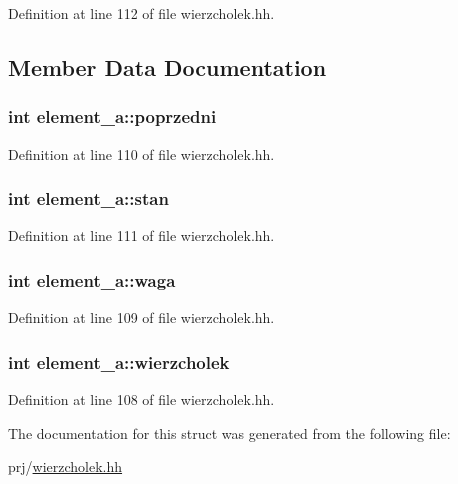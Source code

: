 \-Definition at line 112 of file wierzcholek.\-hh.



\subsection{\-Member \-Data \-Documentation}
\hypertarget{structelement__a_a4e6b23a45c539eea4ab51d74aeef11e2}{
\subsubsection[{poprzedni}]{\setlength{\rightskip}{0pt plus 5cm}int {\bf element\-\_\-a\-::poprzedni}}}\label{structelement__a_a4e6b23a45c539eea4ab51d74aeef11e2}


\-Definition at line 110 of file wierzcholek.\-hh.

\hypertarget{structelement__a_a1be911aa9cf4faf7105ae58ec04d4bd7}{
\subsubsection[{stan}]{\setlength{\rightskip}{0pt plus 5cm}int {\bf element\-\_\-a\-::stan}}}\label{structelement__a_a1be911aa9cf4faf7105ae58ec04d4bd7}


\-Definition at line 111 of file wierzcholek.\-hh.

\hypertarget{structelement__a_a0c44e77b4e694ff0f7e2a5ec75a78f48}{
\subsubsection[{waga}]{\setlength{\rightskip}{0pt plus 5cm}int {\bf element\-\_\-a\-::waga}}}\label{structelement__a_a0c44e77b4e694ff0f7e2a5ec75a78f48}


\-Definition at line 109 of file wierzcholek.\-hh.

\hypertarget{structelement__a_acebbe0c4962a9b7f11702c041474bdfc}{
\subsubsection[{wierzcholek}]{\setlength{\rightskip}{0pt plus 5cm}int {\bf element\-\_\-a\-::wierzcholek}}}\label{structelement__a_acebbe0c4962a9b7f11702c041474bdfc}


\-Definition at line 108 of file wierzcholek.\-hh.



\-The documentation for this struct was generated from the following file\-:\begin{DoxyCompactItemize}
\item 
prj/\hyperlink{wierzcholek_8hh}{wierzcholek.\-hh}\end{DoxyCompactItemize}
